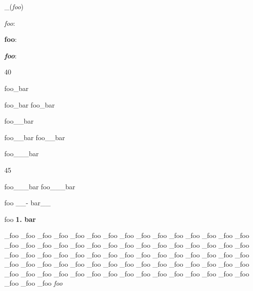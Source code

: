 _(\emph{foo})

\emph{foo}:

\textbf{foo}:

\textbf{\emph{foo}}:

40

foo_bar

foo_bar foo_bar

foo__bar

foo__bar foo__bar

foo___bar

45

foo___bar foo___bar

foo __- bar__

foo \textbf{1. bar}

_foo
_foo
_foo
_foo
_foo
_foo
_foo
_foo
_foo
_foo
_foo
_foo
_foo
_foo
_foo
_foo
_foo
_foo
_foo
_foo
_foo
_foo
_foo
_foo
_foo
_foo
_foo
_foo
_foo
_foo
_foo
_foo
_foo
_foo
_foo
_foo
_foo
_foo
_foo
_foo
_foo
_foo
_foo
_foo
_foo
_foo
_foo
_foo
_foo
_foo
_foo
_foo
_foo
_foo
_foo
_foo
_foo
_foo
_foo
_foo
_foo
_foo
_foo
_foo
_foo
_foo
_foo
_foo
_foo
_foo
_foo
_foo
_foo
_foo
_foo
_foo
_foo
_foo
\emph{foo}
